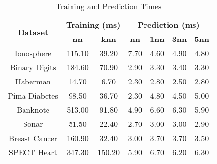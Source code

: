 \begin{table}[htbp]
\caption{Training and Prediction Times}
\begin{center}
\begin{tabular}{|c|c|c|c|c|c|c|}
\hline
\multirow{2}{*}{\textbf{Dataset}} & \multicolumn{2}{c|}{\textbf{Training (ms)}} & \multicolumn{4}{c|}{\textbf{Prediction (ms)}} \\ \cline{2-7}
 & \textbf{nn} & \textbf{knn} & \textbf{nn} & \textbf{1nn} & \textbf{3nn} & \textbf{5nn} \\ \hline
Ionosphere & 115.10 & 39.20 & 7.70 & 4.60 & 4.90 & 4.80 \\ \hline
Binary Digits & 184.60 & 70.90 & 2.90 & 3.30 & 3.40 & 3.30 \\ \hline
Haberman & 14.70 & 6.70 & 2.30 & 2.80 & 2.50 & 2.80 \\ \hline
Pima Diabetes & 98.50 & 36.70 & 2.30 & 4.80 & 4.50 & 5.00 \\ \hline
Banknote & 513.00 & 91.80 & 4.90 & 6.60 & 6.30 & 5.90 \\ \hline
Sonar & 51.50 & 22.40 & 2.70 & 3.00 & 3.00 & 2.90 \\ \hline
Breast Cancer & 160.90 & 32.40 & 3.00 & 3.70 & 3.70 & 3.50 \\ \hline
SPECT Heart & 347.30 & 150.20 & 5.90 & 6.70 & 6.20 & 6.30 \\ \hline
\end{tabular}
\label{tab:timing}
\end{center}
\end{table}